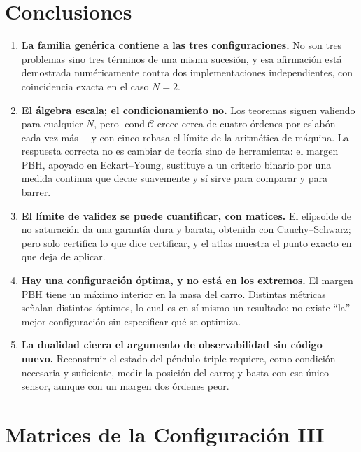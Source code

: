 \documentclass[11pt,letterpaper]{article}
\theoremstyle{definition}
\theoremstyle{plain}
\theoremstyle{remark}
\newcommand{\calC}{\mathcal{C}}
\begin{document}
\section{Conclusiones}

\begin{enumerate}
  \item \textbf{La familia genérica contiene a las tres configuraciones.} No son
  tres problemas sino tres términos de una misma sucesión, y esa afirmación está
  demostrada numéricamente contra dos implementaciones independientes, con
  coincidencia exacta en el caso $N=2$.

  \item \textbf{El álgebra escala; el condicionamiento no.} Los teoremas siguen
  valiendo para cualquier $N$, pero $\operatorname{cond}\calC$ crece cerca de
  cuatro órdenes por eslabón ---cada vez más--- y con cinco rebasa el límite de
  la aritmética de máquina.
  La respuesta correcta no es cambiar de teoría sino de herramienta: el margen
  PBH, apoyado en Eckart--Young, sustituye a un criterio binario por una medida
  continua que decae suavemente y sí sirve para comparar y para barrer.

  \item \textbf{El límite de validez se puede cuantificar, con matices.} El
  elipsoide de no saturación da una garantía dura y barata, obtenida con
  Cauchy--Schwarz; pero solo certifica lo que dice certificar, y el atlas muestra
  el punto exacto en que deja de aplicar.

  \item \textbf{Hay una configuración óptima, y no está en los extremos.} El
  margen PBH tiene un máximo interior en la masa del carro. Distintas métricas
  señalan distintos óptimos, lo cual es en sí mismo un resultado: no existe
  ``la'' mejor configuración sin especificar qué se optimiza.

  \item \textbf{La dualidad cierra el argumento de observabilidad sin código
  nuevo.} Reconstruir el estado del péndulo triple requiere, como condición
  necesaria y suficiente, medir la posición del carro; y basta con ese único
  sensor, aunque con un margen dos órdenes peor.
\end{enumerate}

\appendix
\section{Matrices de la Configuración III}
\label{ap:matrices}
\end{document}
